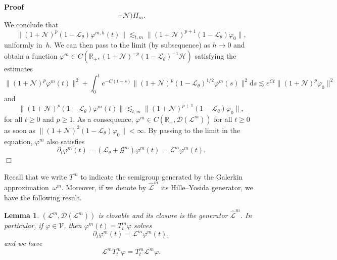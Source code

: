 \documentclass{article}
\newcommand{\mathd}{\mathrm{d}}
\newenvironment{proof}{\noindent\textbf{Proof\ }}{\hspace*{\fill}$\Box$\medskip}
\newtheorem{lemma}{Lemma}
\begin{document}
\begin{proof}
\[     +\mathcal{N}) \Pi_m . \]
  We conclude that
  \[ \| (1 +\mathcal{N})^p (1 -\mathcal{L}_{\theta}) \varphi^{m, h} (t) \|
     \lesssim_{t, m} \| (1 +\mathcal{N})^{p + 1} (1 -\mathcal{L}_{\theta})
     \varphi_0 \|, \]
  uniformly in~$h$. We can then pass to the limit (by subsequence) as $h
  \rightarrow 0$ and obtain a function $\varphi^m \in C (\mathbb{R}_+, (1
  +\mathcal{N})^{- p} (1 -\mathcal{L}_{\theta})^{- 1} \mathcal{H})$ satisfying
  the estimates
  \[ \| (1 +\mathcal{N})^p \varphi^m (t) \|^2 + \int_0^t e^{- C (t - s)} \| (1
     +\mathcal{N})^p (1 -\mathcal{L}_{\theta})^{1 / 2} \varphi^m (s) \|^2
     \mathd s \lesssim e^{C t} \| (1 +\mathcal{N})^p \varphi_0 \|^2 \]
  and
  \[ \| (1 +\mathcal{N})^p (1 -\mathcal{L}_{\theta}) \varphi^m (t) \|
     \lesssim_{t, m} \| (1 +\mathcal{N})^{p + 1} (1 -\mathcal{L}_{\theta})
     \varphi_0 \|, \]
  for all $t \geqslant 0$ and $p \geqslant 1$. As a consequence, $\varphi^m
  \in C (\mathbb{R}_+, \mathcal{D} (\mathcal{L}^m))$ for all $t \geqslant 0$
  as soon as $\| (1 +\mathcal{N})^2 (1 -\mathcal{L}_{\theta}) \varphi_0 \| <
  \infty$. By passing to the limit in the equation, $\varphi^m$ also satisfies
  \[ \partial_t \varphi^m (t) = (\mathcal{L}_{\theta} +\mathcal{G}^m)
     \varphi^m (t) =\mathcal{L}^m \varphi^m (t) . \]
\end{proof}

Recall that we write $T^m$ to indicate the semigroup generated by the Galerkin
approximation~$\omega^m$. Moreover, if we denote by $\hat{\mathcal{L}}^m$ its
Hille--Yosida generator, we have the following result.

\begin{lemma}
  \label{eq:lemma-lm}$(\mathcal{L}^m, \mathcal{D} (\mathcal{L}^m))$ is
  closable and its closure is the generator $\hat{\mathcal{L}}^m$. In
  particular, if $\varphi \in \mathcal{V}$, then $\varphi^m (t) = T^m_t
  \varphi$ solves
  \[ \partial_t \varphi^m (t) =\mathcal{L}^m \varphi^m (t), \]
  and we have
  \[ \mathcal{L}^m T^m_t \varphi = T^m_t \mathcal{L}^m \varphi . \]
\end{lemma}
\end{document}
